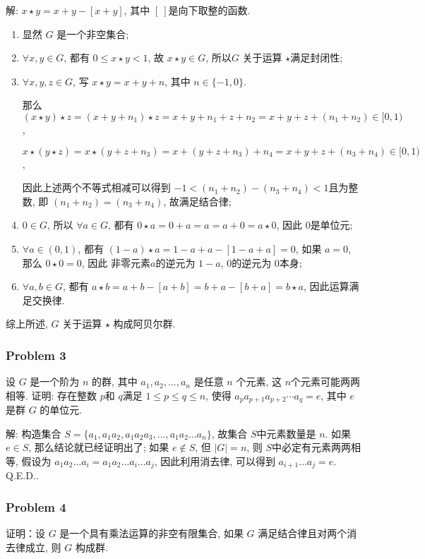 \documentclass[a4paper,12pt]{ctexart}
\begin{document}
    解: $ x \star y=x+y-[x+y] $, 其中 $ [ ~] $是向下取整的函数.
    \begin{enumerate}[label=(\arabic*)]
      \item 显然 $ G $ 是一个非空集合; 
      \item $ \forall x,y\in G $, 都有 $ 0\le x\star y<1 $, 故 $ x\star y\in G $, 所以$ G $ 关于运算 $ \star $满足封闭性;
      \item $ \forall x,y,z\in G $, 写 $ x\star y=x+y+n $, 其中 $ n\in\{-1,0\} $. 
      
      那么 $ (x\star y)\star z = (x+y+n_1)\star z = x+y+n_1+z+n_2 = x+y+z+(n_1+n_2)\in [0,1) $,
      
      $ x\star (y\star z) = x\star (y+z+n_3) = x+(y+z+n_3)+n_4 = x+y+z+(n_3+n_4)\in [0,1) $,
      
      因此上述两个不等式相减可以得到 $ -1 < (n_1+n_2) - (n_3+n_4) <1 $且为整数, 
      即 $ (n_1+n_2) = (n_3+n_4) $, 故满足结合律;
      \item $ 0\in G $, 所以 $ \forall a\in G $, 都有 $ 0\star a=0+a=a=a+0=a\star 0 $, 因此 $ 0 $是单位元;
      \item $ \forall a\in(0,1) $, 都有 $ (1-a)\star a=1-a+a-[1-a+a]=0 $, 如果 $ a=0 $, 那么 $ 0\star 0=0 $, 因此 非零元素$ a $的逆元为 $ 1-a $, $ 0 $的逆元为 $ 0 $本身;
      \item $ \forall a,b\in G $, 都有 $ a\star b=a+b-[a+b]=b+a-[b+a]=b\star a $, 因此运算满足交换律.
    \end{enumerate}
    综上所述, $ G $ 关于运算 $ \star $ 构成阿贝尔群.
\subsubsection*{Problem 3}
    设 $ G $ 是一个阶为 $ n $ 的群, 其中 $ a_1,a_2,...,a_n $ 是任意 $ n $ 个元素, 这 $ n $个元素可能两两相等. 
     证明: 存在整数 $ p $和 $ q $满足 $ 1\le p\le q\le n $, 
     使得 $ a_pa_{p+1}a_{p+2}\cdots a_q=e $, 其中 $ e $ 是群 $ G $ 的单位元.

    解: 构造集合 $ S=\{a_1,a_1a_2,a_1a_2a_3,...,a_1a_2...a_n\} $, 故集合 $ S $中元素数量是 $ n $. 如果 $ e\in S $, 
    那么结论就已经证明出了; 如果 $ e\notin S $, 但 $ |G|=n $, 则 $ S $中必定有元素两两相等, 
    假设为 $ a_1a_2\dots a_i=a_1a_2\dots a_i\dots a_j $, 因此利用消去律, 可以得到 $ a_{i+1}\dots a_j=e $. Q.E.D..

\subsubsection*{Problem 4}
    证明：设 $ G $ 是一个具有乘法运算的非空有限集合, 如果 $ G $ 满足结合律且对两个消去律成立, 则 $ G $ 构成群.
\end{document}
